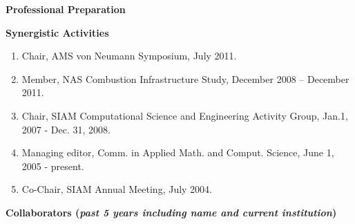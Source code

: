 \documentclass[11pt,letterpaper,english]{article}
\begin{document}
\begin{flushleft} {\bf Professional Preparation}
{}


\vspace{.04in}
{\bf Synergistic Activities}
\vspace{-6pt}
\begin{enumerate} \itemsep1pt \parskip0pt 
\item Chair, AMS von Neumann Symposium, July 2011. \\
\item Member, NAS Combustion Infrastructure Study, December 2008 -- December 2011.\\
\item Chair, SIAM Computational Science and Engineering Activity Group, Jan.1, 2007 - Dec. 31, 2008.\\
\item Managing editor, Comm. in Applied Math. and Comput. Science, June 1, 2005 - present.\\
\item Co-Chair, SIAM Annual Meeting, July 2004. \\ 
\end{enumerate} 

\vspace{-6pt}
{\bf Collaborators ({\emph{past 5 years including name and current institution}})} 
{\parindent 16pt

}
\end{flushleft}
\end{document}
